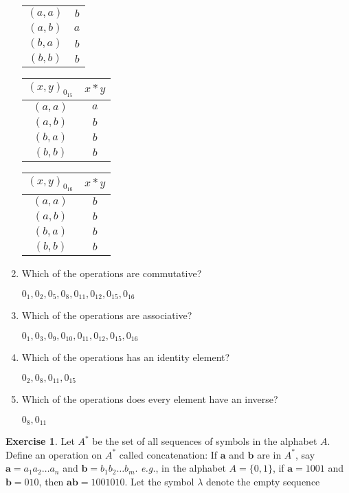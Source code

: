 \documentclass[nohyper,nobib]{tufte-handout}
\theoremstyle{definition}
\newtheorem{exer}[thm]{Exercise}
\theoremstyle{remark}
\begin{document}
\begin{enumerate}
\begin{table}[ht!]
\begin{tabular}{@{}c|c@{}}
                $(a, a)$ & $b$ \\
                $(a, b)$ & $a$ \\
                $(b, a)$ & $b$ \\
                $(b, b)$ & $b$
            \end{tabular}
            \qquad
            \begin{tabular}{@{}c|c@{}}
                $(x, y)_{0_{15}}$ & $x * y$ \\
                \midrule
                $(a, a)$ & $a$ \\
                $(a, b)$ & $b$ \\
                $(b, a)$ & $b$ \\
                $(b, b)$ & $b$
            \end{tabular}
            \qquad
            \begin{tabular}{@{}c|c@{}}
                $(x, y)_{0_{16}}$ & $x * y$ \\
                \midrule
                $(a, a)$ & $b$ \\
                $(a, b)$ & $b$ \\
                $(b, a)$ & $b$ \\
                $(b, b)$ & $b$
            \end{tabular}
        \end{table}
    \item Which of the operations are commutative?

        $0_{1}, 0_{2}, 0_{5}, 0_{8}, 0_{11}, 0_{12}, 0_{15}, 0_{16}$

    \item Which of the operations are associative?

        $0_{1}, 0_{3}, 0_{9}, 0_{10}, 0_{11}, 0_{12}, 0_{15}, 0_{16}$

    \item Which of the operations has an identity element?

        $0_{2}, 0_{8}, 0_{11}, 0_{15}$

    \item Which of the operations does every element have an inverse?

        $0_{8}, 0_{11}$
\end{enumerate}

\begin{exer}
    Let $A^{*}$ be the set of all sequences of symbols in the alphabet $A$. Define an operation on $A^{*}$ called concatenation: If $\mathbf{a}$ and $\mathbf{b}$ are in $A^{*}$, say $\mathbf{a} = a_1a_2\ldots a_n$ and $\mathbf{b} = b_1b_2\ldots b_m$. \emph{e.g.}, in the alphabet $A=\{0, 1\}$, if $\mathbf{a} = 1001$ and $\mathbf{b} = 010$, then $\mathbf{ab} = 1001010$. Let the symbol $\lambda$ denote the empty sequence
\end{exer}
\end{document}
